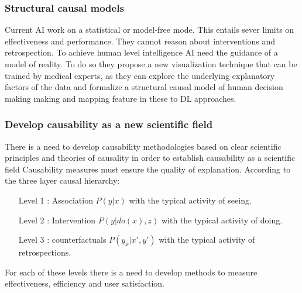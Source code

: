 		\subsubsection{Structural causal models}
		Current AI work on a statistical or model-free mode.
		This entails sever limits on effectiveness and performance.
		They cannot reason about interventions and retrospection.
		To achieve human level intelligence AI need the guidance of a model of reality.
		To do so they propose a new visualization technique that can be trained by medical experts, as they can explore the underlying explanatory factors of the data and formalize a structural causal model of human decision making making and mapping feature in these to DL approaches.

		\subsubsection{Develop causability as a new scientific field}
		There is a need to develop causability methodologies based on clear scientific principles and theories of causality in order to establish causability as a scientific field
		Causability measures must ensure the quality of explanation.
		According to the three layer causal hierarchy:

		\begin{itemize}
			\item[Level 1]: Association $P(y|x)$ with the typical activity of seeing.
			\item[Level 2]: Intervention $P(y|do(x), z)$ with the typical activity of doing.
			\item[Level 3]: counterfactuals $P(y_x|x', y')$ with the typical activity of retrospections.
		\end{itemize}

		For each of these levels there is a need to develop methods to measure effectiveness, efficiency and user satisfaction.
